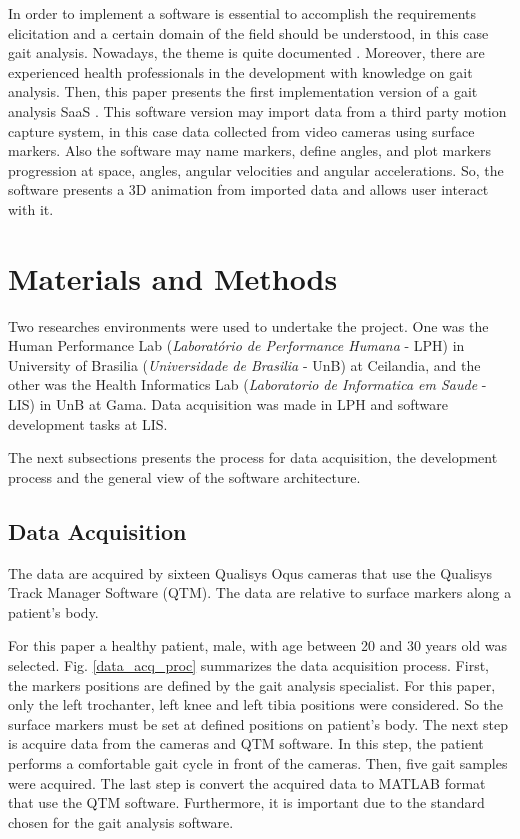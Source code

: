 \documentclass[journal]{IEEEtran}
\begin{document}
In order to implement a software is essential to accomplish the requirements elicitation 
and a certain domain of the field should be understood, in this case gait analysis. 
Nowadays, the theme is quite documented
\cite{Perry2010, Whittle2012, Ferreira2009, Vieira2015, 
Duhamel2004, Ghoussayni2004, Moreno2009, Beynon2010}. 
Moreover, there are experienced health professionals in the development
with knowledge on gait analysis. 
Then, this paper presents the
first implementation version of a gait analysis SaaS \cite{Lima2015}.
This software version may import data from a third party motion capture system, in this
case data collected from video cameras using surface markers. Also the software
may name markers, define angles, and plot 
markers progression at space, angles, angular velocities and angular accelerations.
So, the software presents a 3D animation from imported data and allows user 
interact with it.



\section{Materials and Methods}

Two researches environments were used to undertake the project. 
One was the Human Performance Lab (\emph{Laboratório de Performance Humana} - LPH) in
University of Brasilia (\emph{Universidade de Brasilia} - UnB) at Ceilandia, 
and the other was the Health Informatics Lab (\emph{Laboratorio de Informatica em Saude} - LIS)
in UnB at Gama. 
Data acquisition was made in LPH and software development tasks at LIS.

The next subsections presents the process for data acquisition,
the development process and the general
view of the software architecture.

\subsection{Data Acquisition}

The data are acquired by sixteen Qualisys Oqus cameras that use
the Qualisys Track Manager Software (QTM). 
The data are relative to surface markers along a patient's body.

For this paper a healthy patient, male, with age between 20 and 30 years old
was selected.
Fig. \ref{data_acq_proc} summarizes the data acquisition process.
First,  the  markers positions are defined by the gait analysis specialist. 
For this paper, only the left trochanter, left knee and left tibia
positions were considered. 
So the surface markers must be set at defined positions on patient's body.
The next step is acquire data from the cameras and QTM software. In this
step, the patient performs a comfortable gait cycle in front of the cameras.
Then, five gait samples were acquired.
The last step is convert the acquired data to MATLAB format that use the QTM
software. Furthermore, it is important due to the standard chosen for 
the gait analysis software.
\end{document}
